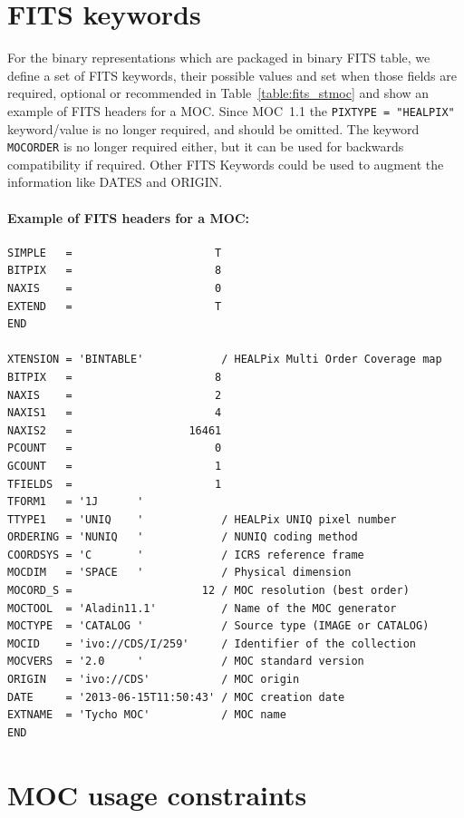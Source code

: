 \documentclass[11pt,a4paper]{ivoa}
\begin{document}
\section{FITS keywords}
\label{sec:fits-key-moc} 
For the binary representations which are packaged in binary FITS table,
we define a set of FITS keywords, their possible values and set when
those fields are required, optional or recommended in
Table~\ref{table:fits_stmoc} and show an example of FITS headers for a MOC.
Since MOC~1.1 \citep{2019ivoa.spec.1007F} the {\tt PIXTYPE = "HEALPIX"}
keyword/value is no longer required, and should be omitted. 
The keyword {\tt MOCORDER} is no longer required either, but it can be used for
backwards compatibility if required.
Other FITS Keywords could be used to augment the information like DATES and ORIGIN. 
 

 
\paragraph{Example of FITS headers for a MOC:}
\par\noindent
\begin{Verbatim}[frame=single, fontsize=\small]
SIMPLE   =                      T
BITPIX   =                      8
NAXIS    =                      0
EXTEND   =                      T
END
    
XTENSION = 'BINTABLE'            / HEALPix Multi Order Coverage map
BITPIX   =                      8
NAXIS    =                      2
NAXIS1   =                      4
NAXIS2   =                  16461
PCOUNT   =                      0
GCOUNT   =                      1
TFIELDS  =                      1
TFORM1   = '1J      '
TTYPE1   = 'UNIQ    '            / HEALPix UNIQ pixel number
ORDERING = 'NUNIQ   '            / NUNIQ coding method
COORDSYS = 'C       '            / ICRS reference frame
MOCDIM   = 'SPACE   '            / Physical dimension
MOCORD_S =                    12 / MOC resolution (best order)
MOCTOOL  = 'Aladin11.1'          / Name of the MOC generator
MOCTYPE  = 'CATALOG '            / Source type (IMAGE or CATALOG)
MOCID    = 'ivo://CDS/I/259'     / Identifier of the collection
MOCVERS  = '2.0     '            / MOC standard version
ORIGIN   = 'ivo://CDS'           / MOC origin
DATE     = '2013-06-15T11:50:43' / MOC creation date
EXTNAME  = 'Tycho MOC'           / MOC name
END
\end{Verbatim}

\section{MOC usage constraints}
\end{document}
